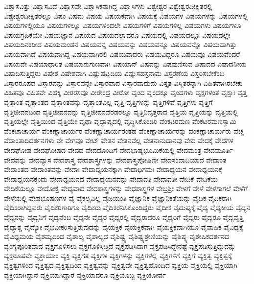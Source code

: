 {ವಿಶ್ವಾಸವಿತ್ತು
ವಿಶ್ವಾಸವಿದೆ
ವಿಶ್ವಾಸವೇ
ವಿಶ್ವಾಸಿಕನಾಗಿದ್ದ
ವಿಶ್ವಾಸಿಗಳು
ವಿಶ್ವೇಶ್ವರ
ವಿಶ್ವೇಶ್ವರದೀಕ್ಷಿತರಲ್ಲಿ
ವಿಶ್ವೇಶ್ವರದೀಕ್ಷಿತರಲ್ಲೂ
ವಿಷಂ
ವಿಷಮ
ವಿಷಯ
ವಿಷಯಕವಾಗಿ
ವಿಷಯಕ್ಕೆ
ವಿಷಯಗಳ
ವಿಷಯಗಳನ್ನು
ವಿಷಯಗಳಲ್ಲಿ
ವಿಷಯಗಳಲ್ಲಿಯೂ
ವಿಷಯಗಳಲ್ಲೂ
ವಿಷಯಗಳಿಂದಲೇ
ವಿಷಯಗಳಿಗೆ
ವಿಷಯಗಳಿಲ್ಲ
ವಿಷಯಗಳು
ವಿಷಯಗಳೂ
ವಿಷಯಗ್ರಹಿಕೆಯೇ
ವಿಷಯಜ್ಞಾನ
ವಿಷಯದ
ವಿಷಯದಲ್ಲಾದರೂ
ವಿಷಯದಲ್ಲಿ
ವಿಷಯದಲ್ಲೂ
ವಿಷಯದಲ್ಲೇ
ವಿಷಯದಿನಕರೀದ
ವಿಷಯಮಂಡನೆ
ವಿಷಯವನ್ನ
ವಿಷಯವನ್ನು
ವಿಷಯವನ್ನೂ
ವಿಷಯವನ್ನೊ
ವಿಷಯವಾಗಿತ್ತು
ವಿಷಯವಾಗಿದೆ
ವಿಷಯವಾಗಿದ್ದ
ವಿಷಯವಾಗಿರಲಿ
ವಿಷಯವಾದರು
ವಿಷಯವಿದ್ದರೂ
ವಿಷಯವೂ
ವಿಷಯವೆಂದರೆ
ವಿಷಯವೇ
ವಿಷಯಾಧಾರಿತ
ವಿಷಯಾನುಗುಣವಾಗಿ
ವಿಷಯಾನ್
ವಿಷವನ್ನು
ವಿಷವುಣಿಸುವ
ವಿಷಾದದ
ವಿಷಾದನೀಯ
ವಿಷಾದಿಸುತ್ತಿದ್ದರು
ವಿಷೇಶ
ವಿಷೇಶವಾಗಿ
ವಿಷ್ಣುಷಟ್ಪದಿಯ
ವಿಷ್ಣುಸಹಸ್ರನಾಮ
ವಿಸ್ತರಣೆಯ
ವಿಸ್ತರಿಸಬೇಕೆಂಬ
ವಿಸ್ತಾರರೂಪದ
ವಿಸ್ತಾರವನ್ನು
ವಿಸ್ತಾರವನ್ನೇ
ವಿಸ್ತಾರವಾದ
ವಿಸ್ತಾರವಾದುದು
ವಿಸ್ತೃತ
ವಿಸ್ಮಿತರನ್ನಾಗಿ
ವಿಹಿತವಾಗಿರಬೇಕು
ವಿಹಿತವೂ
ವಿಹಿತವೇ
ವಿಹಕ್ಕಿ
ವೀರರಸವೂ
ವೀರೇಂದ್ರ
ವೀರೋ
ವೃಂದ
ವೃಂದಕ್ಕೂ
ವೃಂದಗಳು
ವೃಕ್ಷಗಳಂತೆ
ವೃಕ್ಷಾಃ
ವೃತ್ತ
ವೃತ್ತಾಂತ
ವೃತ್ತಾಂತದ
ವೃತ್ತಾಂತವನ್ನು
ವೃತ್ತಾಂತವಿಲ್ಲ
ವೃತ್ತಿ
ವೃತ್ತಿಗಳನ್ನು
ವೃತ್ತಿಗಳಿವೆ
ವೃತ್ತಿಗಳು
ವೃತ್ತಿಗೆ
ವೃತ್ತಿಜೀವನದಿಂದ
ವೃತ್ತಿಜೀವನವನ್ನು
ವೃತ್ತಿಜೀವನವೆರಡರಲ್ಲೂ
ವೃತ್ತಿನಿವೃತ್ತರಾದ
ವೃತ್ತಿಯ
ವೃತ್ತಿಯನ್ನು
ವೃತ್ತಿಯಲ್ಲಿ
ವೃತ್ತಿಯಲ್ಲೇ
ವೃತ್ತಿಯಿಂದ
ವೃತ್ತಿಯೇ
ವೃಥಾ
ವೃದ್ಧಾಪ್ಯದಲ್ಲಿ
ವೃದ್ಧಿಸಿಕೊಂಡಿರಿ
ವೆಂಕಟರಮಣ
ವೆಂಕಟರಮಣಸ್ವಾಮಿ
ವೆಂಕಟಾಚಾರ್ಯ
ವೆಂಕಣ್ಣಾಚಾರ್ಯರ
ವೆಂಕಣ್ಣಾಚಾರ್ಯರಂತಹ
ವೆಂಕಣ್ಣಾಚಾರ್ಯರನ್ನು
ವೆಂಕಣ್ಣಾಚಾರ್ಯರು
ವೆಚ್ಚ
ವೆದಾಂತಾದಿದರ್ಶನಗಳು
ವೇ
ವೇಗವೂ
ವೇಟ್
ವೇತನ
ವೇತನವೆಲ್ಲ
ವೇತನಾನುದಾನವು
ವೇದ
ವೇದಕ್ಕೆ
ವೇದಗಳ
ವೇದಘೋಷ
ವೇದಘೋಷದ
ವೇದದ
ವೇದದೊಂದಿಗೆ
ವೇದಭಾಷ್ಯಭೂಮಿಕೆಯಲ್ಲಿ
ವೇದಮಂತ್ರ
ವೇದಮೂರ್ತಿ
ವೇದವನ್ನು
ವೇದವ್ಯಾಸ
ವೇದಶಾಸ್ತ್ರ
ವೇದಶಾಸ್ತ್ರಗಳನ್ನು
ವೇದಶಾಸ್ತ್ರಪೋಷಿಣೀ
ವೇದಸಂವಾದಿಯಾದ
ವೇದಾಂತ
ವೇದಾಂತದ
ವೇದಾಂತವನ್ನು
ವೇದಾಃ
ವೇದಾದ್ಯಯನಕ್ಕಾಗಿ
ವೇದಾಧಿಗಮಃ
ವೇದಾಧ್ಯಯನ
ವೇದಾಧ್ಯಯನಕ್ಕೆ
ವೇದಾಧ್ಯಯನಕ್ಕೆಂದು
ವೇದಾಧ್ಯಯನದ
ವೇದಾಧ್ಯಯನವನ್ನು
ವೇದಾವತಿ
ವೇದಾವತೀ
ವೇದಿಕೆ
ವೇದಿಕೆಯ
ವೇದಿಕೆಯಲ್ಲೂ
ವೇದೋಕ್ತ
ವೇದ್ಯವಾದ
ವೇದಶಾಸ್ತ್ರಗಳನ್ನು
ವೇಧಶಾಸ್ತ್ರಗಳ
ವೇಬ್ರಶ್ರೀ
ವೇಳಗೆ
ವೇಳೆ
ವೇಳೆಗಾಗಲೆ
ವೇಳೆಗೆ
ವೇಳೆಯಲ್ಲಿ
ವೇಷಭೂಷಣಗಳ
ವೈ
ವೈಕಲ್ಯವಿಲ್ಲ
ವೈಜಯಂತಿ
ವೈಜ್ಞಾನಿಕ
ವೈಜ್ಞಾನಿಕತೆಯನ್ನು
ವೈದಿಕ
ವೈದಿಕರಾಗಿ
ವೈದಿಕರಾಗಿದ್ದವರು
ವೈದಿಕರಿಗಾರಿಗೂ
ವೈದಿಕರು
ವೈದಿಕರೆನಿಸಿಕೊಂಡಿದ್ದರು
ವೈದೀಕ
ವೈದುಷ್ಯಕ್ಕೆ
ವೈದ್ಯ
ವೈದ್ಯಕೀಯ
ವೈದ್ಯನ
ವೈದ್ಯನನ್ನು
ವೈದ್ಯನಿಗೆ
ವೈದ್ಯನೆಂಬ
ವೈದ್ಯನೇ
ವೈದ್ಯರ
ವೈದ್ಯರಲ್ಲಿ
ವೈದ್ಯರಾದರೂ
ವೈದ್ಯರಿಗೆ
ವೈದ್ಯರು
ವೈದ್ಯರೂ
ವೈದ್ಯವೃತ್ತಿ
ವೈದ್ಯಾಶ್ಚ
ವೈದ್ಯೋ
ವೈಭವೀಕರಿಸುತ್ತಿರುವುದನ್ನು
ವೈಯಕ್ತಿಕ
ವೈಯಕ್ತಿಕವಾಗಿ
ವೈಯಕ್ತಿಕವಾಗಿಯೂ
ವೈವಾಹಿಕ
ವೈವಿಧ್ಯಕ್ಕೆ
ವೈವಿಧ್ಯಮಯ
ವೈಶಮ್ಯದಿಂದ
ವೈಶಾಲ್ಯ
ವೈಶಾಲ್ಯದ
ವೈಶಿಷ್ಟ್ಯ
ವೈಶಿಷ್ಟ್ಯಶ್ರೇಣಿಯನ್ನು
ವೈಶಿಷ್ಠ್ಯ
ವೈಶೇಷಿಕದರ್ಶನದ
ವ್ಯಂಗ್ಯಪೂರಿತವಾದ
ವ್ಯಕ್ತಗೊಳಿಸಲು
ವ್ಯಕ್ತಗೊಳಿಸಿದ್ದಿದೆ
ವ್ಯಕ್ತಪಡಿಸಿದಾಗ
ವ್ಯಕ್ತಪಡಿಸಿದ್ದೇನಷ್ಟೆ
ವ್ಯಕ್ತಪಡಿಸುತ್ತಿದ್ದುದನ್ನು
ವ್ಯಕ್ತರೂಪವೇ
ವ್ಯಕ್ತಾಯಾಂ
ವ್ಯಕ್ತಿ
ವ್ಯಕ್ತಿಗತ
ವ್ಯಕ್ತಿಗಳ
ವ್ಯಕ್ತಿಗಳನ್ನು
ವ್ಯಕ್ತಿಗಳಲ್ಲಿ
ವ್ಯಕ್ತಿಗಳಿಗೆ
ವ್ಯಕ್ತಿಗೆ
ವ್ಯಕ್ತಿತ್ವ
ವ್ಯಕ್ತಿತ್ವಕ್ಕೆ
ವ್ಯಕ್ತಿತ್ವಗಳಿಂದ
ವ್ಯಕ್ತಿತ್ವದ
ವ್ಯಕ್ತಿತ್ವದಿಂದ
ವ್ಯಕ್ತಿತ್ವವನ್ನು
ವ್ಯಕ್ತಿತ್ವವೇ
ವ್ಯಕ್ತಿತ್ವಹೊಂದಿದ
ವ್ಯಕ್ತಿಯ
ವ್ಯಕ್ತಿಯಲ್ಲಿ
ವ್ಯಕ್ತಿಯಾಗಿ
ವ್ಯಕ್ತಿಯಾಗಿದ್ದಾನೆ
ವ್ಯಕ್ತಿಯಾಗಿದ್ದಾರೆ
ವ್ಯಕ್ತಿಯಾದರೂ
ವ್ಯಕ್ತಿಯೊಬ್ಬ
ವ್ಯಕ್ತಿಯೋರ್ವ
}
